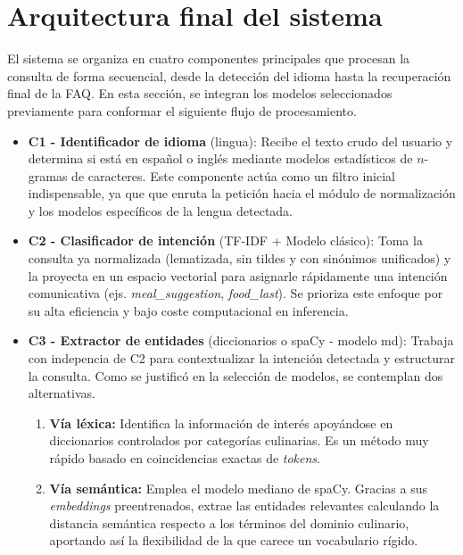 \documentclass[11pt,a4paper,twoside]{article}
\theoremstyle{definition}
\numberwithin{equation}{section}
\begin{document}

\section{Arquitectura final del sistema}
El sistema se organiza en cuatro componentes principales que procesan la consulta de forma secuencial, desde la detección del idioma hasta la recuperación final de la FAQ. En esta sección, se integran los modelos seleccionados previamente para conformar el siguiente flujo de procesamiento.
\begin{itemize}
	\item \textbf{C1 - Identificador de idioma} (lingua): Recibe el texto crudo del usuario y determina si está en español o inglés mediante modelos estadísticos de $n$-gramas de caracteres. Este componente actúa como un filtro inicial indispensable, ya que que enruta la petición hacia el módulo de normalización y los modelos específicos de la lengua detectada.
	
	\item \textbf{C2 - Clasificador de intención} (TF-IDF + Modelo clásico): Toma la consulta ya normalizada (lematizada, sin tildes y con sinónimos unificados) y la proyecta en un espacio vectorial para asignarle rápidamente una intención comunicativa (ejs. \textit{meal\_suggestion}, \textit{food\_last}). Se prioriza este enfoque por su alta eficiencia y bajo coste computacional en inferencia.
	
	\item \textbf{C3 - Extractor de entidades} (diccionarios o spaCy - modelo md): Trabaja con indepencia de C2 para contextualizar la intención detectada y estructurar la consulta. Como se justificó en la selección de modelos, se contemplan dos alternativas.
	\begin{enumerate}
		\item \textbf{Vía léxica:} Identifica la información de interés apoyándose en diccionarios controlados por categorías culinarias. Es un método muy rápido basado en coincidencias exactas de \textit{tokens}.
		\item \textbf{Vía semántica:} Emplea el modelo mediano de spaCy. Gracias a sus \textit{embeddings} preentrenados, extrae las entidades relevantes calculando la distancia semántica respecto a los términos del dominio culinario, aportando así la flexibilidad de la que carece un vocabulario rígido.
	\end{enumerate}
	
	\vspace{1pt}
	

\end{itemize}
\end{document}
